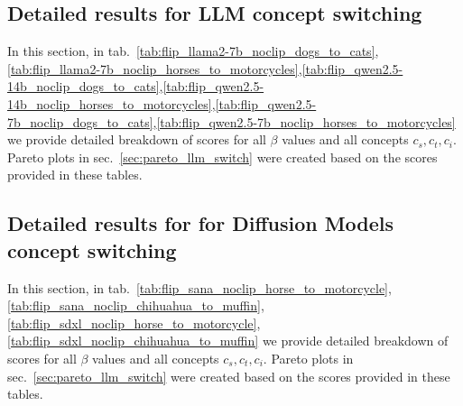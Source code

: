 \clearpage
\subsection{Detailed results for LLM concept switching}
\label{sec:tables_llm_switch}

In this section, in tab.~\ref{tab:flip_llama2-7b_noclip_dogs_to_cats},\ref{tab:flip_llama2-7b_noclip_horses_to_motorcycles},\ref{tab:flip_qwen2.5-14b_noclip_dogs_to_cats},\ref{tab:flip_qwen2.5-14b_noclip_horses_to_motorcycles},\ref{tab:flip_qwen2.5-7b_noclip_dogs_to_cats},\ref{tab:flip_qwen2.5-7b_noclip_horses_to_motorcycles} we provide detailed breakdown of scores for all $\beta$ values and all concepts $c_s, c_t, c_i$. Pareto plots in sec.~\ref{sec:pareto_llm_switch} were created based on the scores provided in these tables.




\clearpage
\subsection{Detailed results for for Diffusion Models concept switching}
\label{sec:tables_diffusion_switch}
In this section, in tab.~\ref{tab:flip_sana_noclip_horse_to_motorcycle},\ref{tab:flip_sana_noclip_chihuahua_to_muffin},\ref{tab:flip_sdxl_noclip_horse_to_motorcycle},\ref{tab:flip_sdxl_noclip_chihuahua_to_muffin} we provide detailed breakdown of scores for all $\beta$ values and all concepts $c_s, c_t, c_i$. Pareto plots in sec.~\ref{sec:pareto_llm_switch} were created based on the scores provided in these tables.


